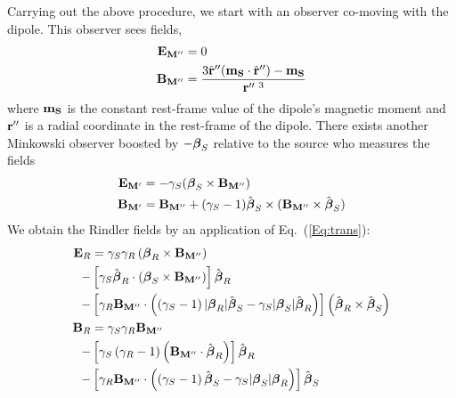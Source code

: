 Carrying out the above procedure, we start with an observer co-moving with the dipole. This observer sees fields,
\begin{align}
{\bf E_{M^{\prime \prime}}} & = 0 \nonumber \\
{\bf B_{M^{\prime \prime}}} & = \frac{3 \hat {\bf r}^{\prime\prime} ({\bf
    m_S}\cdot \hat {\bf r}^{\prime\prime})-{\bf m_S}}{{\bf r}^{\prime\prime \ 3}} 
\label{Eq:MinkD}
\end{align}
where ${\bf m_S}$ is the constant rest-frame value of the dipole's
magnetic moment and 
${\bf r}^{\prime\prime}$ is a radial coordinate in the rest-frame of the dipole. 
There exists another Minkowski observer boosted by $-{\boldsymbol \beta}_S$ relative to
the source who measures the fields
\begin{align}
{\bf E_{M^\prime}} & =  -\gamma_S({\boldsymbol \beta}_S\times {\bf B_{M^{\prime \prime}}})  \nonumber \\
{\bf B_{M^\prime}} & ={ \bf B_{M^{\prime \prime}}} +(\gamma_S-1) \hat {{\boldsymbol \beta}}_S\times ({\bf B_{M^{\prime \prime}}}\times \hat {{\boldsymbol \beta}}_S)
\label{Eq:transstep}
\end{align}
We obtain the Rindler fields by an application of Eq.\  (\ref{Eq:trans}):
\begin{align}
{\bf E}_R & =\gamma_S \gamma_R \left( {\boldsymbol \beta}_R \times \mathbf{ B_{M^{\prime \prime}}} \right)  \nonumber \\
-&  \left[ \gamma_S \hat{{\boldsymbol \beta}}_R \cdot \left({\boldsymbol \beta}_S \times \mathbf{ B_{M^{\prime \prime}}}   \right) \right] \hat{{\boldsymbol \beta}}_R  \nonumber \\
-& \left[   \gamma_R  \mathbf{ B_{M^{\prime \prime}}} \cdot \left(  \left( \gamma_S -1\right) |{\boldsymbol \beta}_R| \hat{{\boldsymbol \beta}}_S - \gamma_S |{\boldsymbol \beta}_S|  \hat{{\boldsymbol \beta}}_R \right) \right] \left( \hat{{\boldsymbol \beta}}_R \times \hat{{\boldsymbol \beta}}_S  \right)
 \nonumber \\ 
{\bf B}_R & = \gamma_S \gamma_R  \mathbf{ B_{M^{\prime \prime}}} \nonumber \\
-& \left[ \gamma_S \left( \gamma_R -1 \right) \left(  \mathbf{ B_{M^{\prime \prime}}}  \cdot \hat{{\boldsymbol \beta}}_R\right) \right] \hat{{\boldsymbol \beta}}_R \nonumber \\
-& \left[\gamma_R   \mathbf{ B_{M^{\prime \prime}}}  \cdot  \left( \left(\gamma_S -1 \right) \hat{{\boldsymbol \beta}}_S  - \gamma_S |{\boldsymbol \beta}_S| {\boldsymbol \beta}_R\right)   \right] \hat{{\boldsymbol \beta}}_S
\label{Eq:ERBR_BINF}
\end{align}



